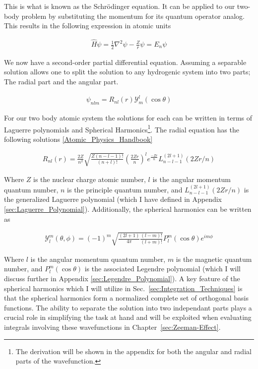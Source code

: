         This is what is known as the Schrödinger equation. It can be applied to our two-body problem by substituting the momentum for its quantum operator analog. This results in the following expression in atomic units 

        \begin{align}
            \hat{H} \psi  = \frac{1}{2} \nabla^2 \psi - \frac{Z}{r} \psi = E_n \psi 
        \end{align}

        We now have a second-order partial differential equation. Assuming a separable solution allows one to split the solution to any hydrogenic system into two parts; The radial part and the angular part.

        \begin{align}
            \psi_{nlm} = R_{nl}(r) \mathcal{Y}^l_m (\cos \theta)
        \end{align}

        \noindent For our two body atomic system the solutions for each can be written in terms of Laguerre polynomials and Spherical Harmonics\footnote{The derivation will be shown in the appendix for both the angular and radial parts of the wavefunction.}. The radial equation has the following solutions \ref{Atomic_Physics_Handbook}

        \begin{align}
            R_{nl}(r) = \frac{2Z}{n^2} \sqrt{\frac{Z(n - l - 1)!}{(n + l)!}} \left( \frac{2Zr}{n} \right)^l e^{\frac{-Zr}{n}} L_{n - l - 1}^{(2l + 1)} \left( 2Zr/n \right) \label{eq:radial_equation}
        \end{align}

        Where $Z$ is the nuclear charge atomic number, $l$ is the angular momentum quantum number, $n$ is the principle quantum number, and $L_{n - l - 1}^{(2l + 1)} (2Zr/n)$ is the generalized Laguerre polynomial (which I have defined in Appendix \ref{sec:Laguerre_Polynomial}). Additionally, the spherical harmonics can be written as

        \begin{align}
            \mathcal{Y}^m_l (\theta, \phi) = (-1)^m \sqrt{\frac{(2l + 1)}{4 \pi}\frac{(l - m)!}{(l + m)!}} P_l^m (\cos \theta) e^{i m \phi} \label{eq:angular_equation}
        \end{align}

        Where $l$ is the angular momentum quantum number, $m$ is the magnetic quantum number, and $P_l^m (\cos \theta)$ is the associated Legendre polynomial (which I will discuss further in Appendix \ref{sec:Legendre_Polynomial}). A key feature of the spherical harmonics which I will utilize in Sec.~\ref{sec:Integration_Techniques} is that the spherical harmonics form a normalized complete set of orthogonal basis functions. The ability to separate the solution into two independant parts plays a crucial role in simplifying the task at hand and will be exploited when evaluating integrals involving these wavefunctions in Chapter~\ref{sec:Zeeman-Effect}.

